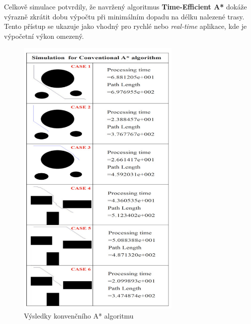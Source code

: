 \documentclass[10pt, a4paper]{article}
\begin{document}
\newpage
Celkově simulace potvrdily, že navržený algoritmus \textbf{Time-Efficient A*} dokáže výrazně zkrátit dobu výpočtu při minimálním dopadu na délku nalezené trasy.
Tento přístup se ukazuje jako vhodný pro rychlé nebo \textit{real-time} aplikace, kde je výpočetní výkon omezený.

\begin{figure}[H]
\centering
\includegraphics[width=0.7\textwidth]{images/conventional_astar.png}
\caption{Výsledky konvenčního A* algoritmu}
\label{fig:astar_standard}
\end{figure}
\end{document}
